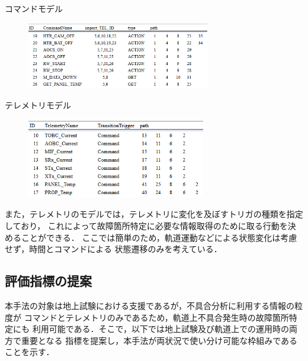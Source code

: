 \documentclass[11pt]{jsarticle}%
\begin{document}
\begin{multicols}{2}
\begin{table}[H]
  \centering
  \caption{コマンドモデル}
  \label{fig:COM}
\end{table}
\vspace{-3zh}
\begin{figure}[H]
  \centering
    \includegraphics[width=8cm]{../figure/COM_resume.png}
\end{figure}
\vspace{-2zh}
\begin{table}[H]
  \centering
  \caption{テレメトリモデル}
  \label{fig:TEL}
\end{table}
\vspace{-3zh}
\begin{figure}[H]
  \centering
    \includegraphics[height=3.5cm]{../figure/TEL_resume.png}
\end{figure}
\vspace{-1zh}
また，テレメトリのモデルでは，テレメトリに変化を及ぼすトリガの種類を指定しており，
これによって故障箇所特定に必要な情報取得のために取る行動を決めることができる．
ここでは簡単のため，軌道運動などによる状態変化は考慮せず，時間とコマンドによる
状態遷移のみを考えている．
\vspace{-1zh}
\subsection{評価指標の提案}
  \vspace{-1zh}
  本手法の対象は地上試験における支援であるが，不具合分析に利用する情報の粒度が
コマンドとテレメトリのみであるため，軌道上不具合発生時の故障箇所特定にも
利用可能である．そこで，以下では地上試験及び軌道上での運用時の両方で重要となる
指標を提案し，本手法が両状況で使い分け可能な枠組みであることを示す．
\vspace{-1zh}

\end{multicols}
\end{document}
